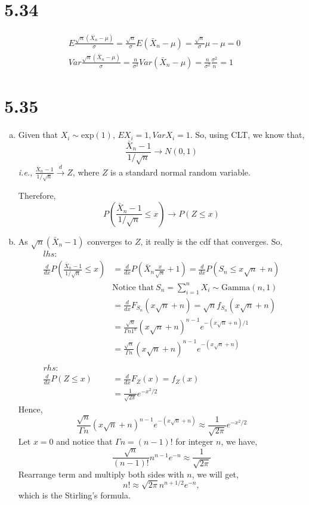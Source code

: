 \documentclass[letterpaper]{article}
\begin{document}
\section*{5.34}
\begin{align*}
E\frac{\sqrt{n} (\bar X_n - \mu)}{\sigma} = \frac{\sqrt{n}}{\sigma} E(\bar X_n - \mu) = \frac{\sqrt{n}}{\sigma} \mu - \mu = 0 \\
Var \frac{\sqrt{n} (\bar X_n - \mu)}{\sigma} = \frac{n}{\sigma^2} Var (\bar X_n - \mu) = \frac{n}{\sigma^2} \frac{\sigma^2}{n} = 1
\end{align*}
\section*{5.35}
\begin{enumerate}[(a)]
\item Given that $X_i \sim \text{exp}(1)$, $EX_i = 1, VarX_i = 1$. So, using CLT, we know that,
\[
\frac{\bar X_n -1}{1/\sqrt{n}} \to N(0, 1)
\]
\emph{i.e.}, $\frac{\bar X_n -1}{1/\sqrt{n}} \stackrel{d}{\to} Z$, where $Z$ is a standard normal random variable.

Therefore,
\[
P(\frac{\bar X_n -1}{1/\sqrt{n}} \le x) \to P(Z \le x)
\]
\item 
As $\sqrt{n}(\bar X_n - 1)$ converges to $Z$, it really is the cdf that converges. So,
\begin{align*}
lhs: & \\
\frac{d}{dx} P(\frac{\bar X_n - 1}{1/\sqrt{n}} \le x) & = \frac{d}{dx}P(\bar X_n \frac{x}{\sqrt{n}}+1) = \frac{d}{dx} P(S_n \le x\sqrt{n} + n)\\
& \text{Notice that}~S_n = \sum_{i=1}^n X_i \sim \text{Gamma}(n, 1)\\
& = \frac{d}{dx} F_{S_n}(x\sqrt{n} + n) = \sqrt{n} f_{S_n}(x\sqrt{n}+n) \\
& = \frac{\sqrt{n}}{\Gamma{n}1^n} (x\sqrt{n}+n)^{n-1} e^{-(x\sqrt{n}+n)/1} \\
& = \frac{\sqrt{n}}{\Gamma{n}} (x\sqrt{n}+n)^{n-1} e^{-(x\sqrt{n}+n)}\\
\\
rhs: & \\
\frac{d}{dx} P(Z \le x) & = \frac{d}{dx} F_Z(x) = f_Z(x) \\
& = \frac{1}{\sqrt{2\pi}} e^{-x^2/2}
\end{align*}
Hence, 
\[
\frac{\sqrt{n}}{\Gamma{n}} (x\sqrt{n}+n)^{n-1} e^{-(x\sqrt{n}+n)} \approx \frac{1}{\sqrt{2\pi}} e^{-x^2/2}
\]
Let $x = 0$ and notice that $\Gamma{n} = (n-1)!$ for integer $n$, we have,
\[
\frac{\sqrt{n}}{(n-1)!} n^{n-1} e^{-n} \approx \frac{1}{\sqrt{2\pi}}
\]
Rearrange term and multiply both sides with $n$, we will get,
\[
n! \approx \sqrt{2\pi} n^{n+1/2} e^{-n},
\]
which is the Stirling's formula.
\end{enumerate}
\end{document}
